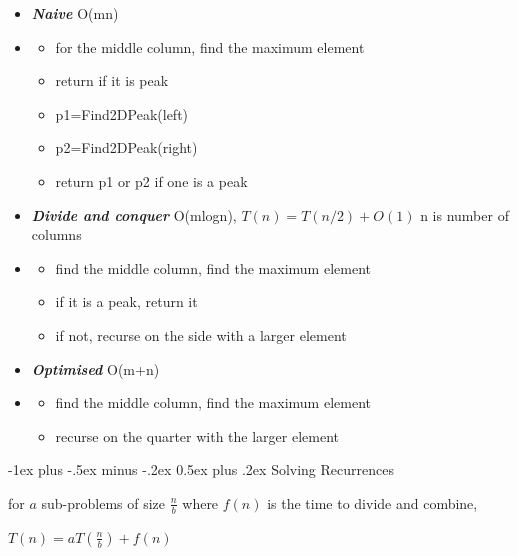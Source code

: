 \documentclass[10pt, landscape]{article}
\makeatletter
\renewcommand{\section}{\@startsection{section}{1}{0mm}%
  {-1ex plus -.5ex minus -.2ex}%
  {0.5ex plus .2ex}%
{\normalfont\large\bfseries}}
\makeatother
\begin{document}
\begin{multicols*}{4}
\begin{itemize}
    \item \textbf{\textit{Naive}} O(mn)
    \item[] \begin{itemize}
      \item for the middle column, find the maximum element
      \item return if it is peak
      \item p1=Find2DPeak(left)
      \item p2=Find2DPeak(right)
      \item return p1 or p2 if one is a peak
    \end{itemize}
    \item \textbf{\textit{Divide and conquer}} O(mlogn), $T(n)=T(n/2)+O(1)$ n is number of columns 
    \item \begin{itemize}
      \item find the middle column, find the maximum element
      \item if it is a peak, return it
      \item if not, recurse on the side with a larger element
    \end{itemize}
    \item \textbf{\textit{Optimised}} O(m+n)
    \item[] 
    \begin{itemize}
      \item find the middle column, find the maximum element
      \item recurse on the quarter with the larger element
    \end{itemize}
  \end{itemize}


  \section{Solving Recurrences}

  for $a$ sub-problems of size $\frac{n}{b}$ where $f(n)$ is the time to divide and combine, 
  \begin{tightcenter}
    $T(n) = aT(\frac{n}{b}) + f(n)$
  \end{tightcenter}



\end{multicols*}
\end{document}
